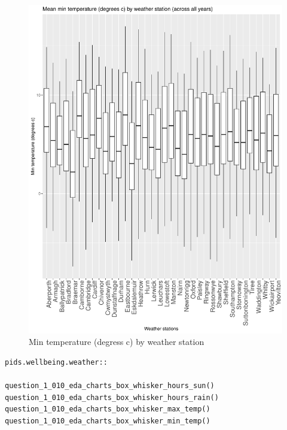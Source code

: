 \documentclass[12pt, oneside, openany]{book}
\begin{document}
\begin{figure}
	\centering
	\captionsetup{justification=centering}
	\includegraphics[scale=0.7]{question_1_010_eda_charts_box_whisker_min_temp}
	\caption{Min temperature (degress c) by weather station}
	\label{fig:question_1_010_eda_charts_box_whisker_min_temp}
\end{figure}

\bigskip
\begin{lstlisting}[caption=Commands to generate question 1 box and whisker charts.,  label={lst:question_1_010_eda_charts_box_whisker}]
pids.wellbeing.weather::

question_1_010_eda_charts_box_whisker_hours_sun()
question_1_010_eda_charts_box_whisker_hours_rain()
question_1_010_eda_charts_box_whisker_max_temp()
question_1_010_eda_charts_box_whisker_min_temp()
\end{lstlisting}
\end{document}
